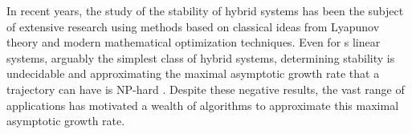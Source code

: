 In recent years, the study of the stability of hybrid systems
has been the subject of extensive research using methods based on classical ideas from Lyapunov theory
and modern mathematical optimization techniques.
Even for s\witch{} linear systems, arguably the simplest class of hybrid systems,
determining stability is undecidable and approximating the maximal asymptotic growth rate that a trajectory can have is NP-hard \cite{blondel2000boundedness}.
Despite these negative results, the vast range of applications has motivated a wealth of algorithms to approximate
this maximal asymptotic growth rate.
